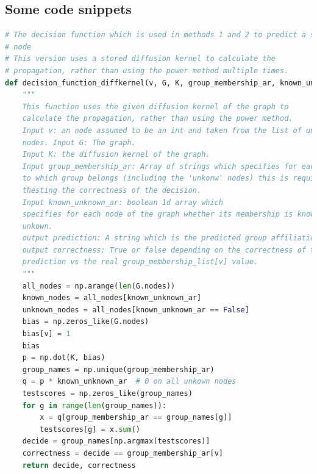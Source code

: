 \documentclass[a4paper,10pt]{article}
\theoremstyle{definition}
\theoremstyle{remark}
\theoremstyle{plain}
\begin{document}
\subsection{Some code snippets}
\begin{lstlisting}[language=python]
# The decision function which is used in methods 1 and 2 to predict a single
# node
# This version uses a stored diffusion kernel to calculate the
# propagation, rather than using the power method multiple times.
def decision_function_diffkernel(v, G, K, group_membership_ar, known_unknown_ar):
    """
    This function uses the given diffusion kernel of the graph to
    calculate the propagation, rather than using the power method.
    Input v: an node assumed to be an int and taken from the list of unkown
    nodes. Input G: The graph.
    Input K: the diffusion kernel of the graph.
    Input group_membership_ar: Array of strings which specifies for each node
    to which group belongs (including the 'unkonw' nodes) this is required for
    thesting the correctness of the decision.
    Input known_unknown_ar: boolean 1d array which
    specifies for each node of the graph whether its membership is known or
    unkown.
    output prediction: A string which is the predicted group affiliation.
    output correctness: True or false depending on the correctness of the
    prediction vs the real group_membership_list[v] value.
    """
    all_nodes = np.arange(len(G.nodes))
    known_nodes = all_nodes[known_unknown_ar]
    unknown_nodes = all_nodes[known_unknown_ar == False]
    bias = np.zeros_like(G.nodes)
    bias[v] = 1
    bias
    p = np.dot(K, bias)
    group_names = np.unique(group_membership_ar)
    q = p * known_unknown_ar  # 0 on all unkown nodes
    testscores = np.zeros_like(group_names)
    for g in range(len(group_names)):
        x = q[group_membership_ar == group_names[g]]
        testscores[g] = x.sum()
    decide = group_names[np.argmax(testscores)]
    correctness = decide == group_membership_ar[v]
    return decide, correctness


\end{lstlisting}
\end{document}
